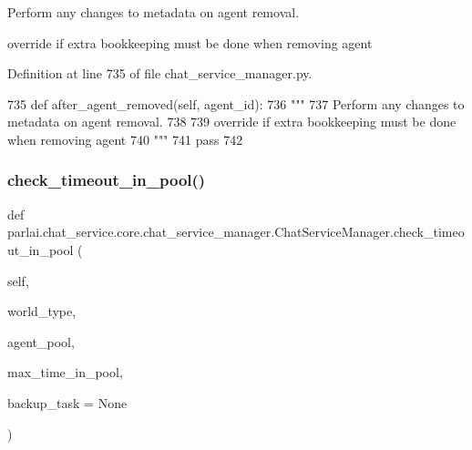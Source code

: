\begin{DoxyVerb}Perform any changes to metadata on agent removal.

override if extra bookkeeping must be done when removing agent
\end{DoxyVerb}
 

Definition at line 735 of file chat\+\_\+service\+\_\+manager.\+py.


\begin{DoxyCode}
735     \textcolor{keyword}{def }after\_agent\_removed(self, agent\_id):
736         \textcolor{stringliteral}{"""}
737 \textcolor{stringliteral}{        Perform any changes to metadata on agent removal.}
738 \textcolor{stringliteral}{}
739 \textcolor{stringliteral}{        override if extra bookkeeping must be done when removing agent}
740 \textcolor{stringliteral}{        """}
741         \textcolor{keywordflow}{pass}
742 
\end{DoxyCode}
\mbox{\label{classparlai_1_1chat__service_1_1core_1_1chat__service__manager_1_1ChatServiceManager_a92c91891bbc88de69040bc979e9da468}} 
\subsubsection{\texorpdfstring{check\+\_\+timeout\+\_\+in\+\_\+pool()}{check\_timeout\_in\_pool()}}
{\footnotesize\ttfamily def parlai.\+chat\+\_\+service.\+core.\+chat\+\_\+service\+\_\+manager.\+Chat\+Service\+Manager.\+check\+\_\+timeout\+\_\+in\+\_\+pool (\begin{DoxyParamCaption}\item[{}]{self,  }\item[{}]{world\+\_\+type,  }\item[{}]{agent\+\_\+pool,  }\item[{}]{max\+\_\+time\+\_\+in\+\_\+pool,  }\item[{}]{backup\+\_\+task = {\ttfamily None} }\end{DoxyParamCaption})}

